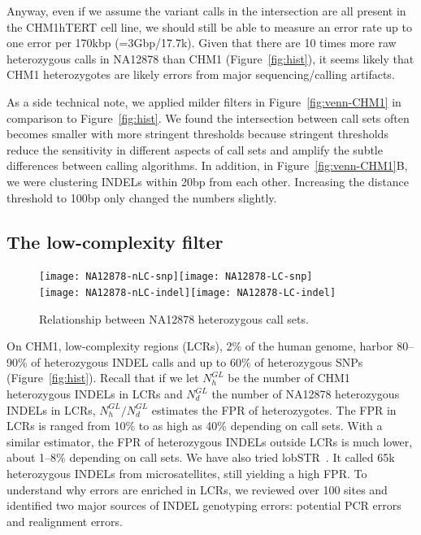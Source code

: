 \documentclass{bioinfo}
\begin{document}
Anyway, even if we assume the variant calls in the intersection are all present
in the CHM1hTERT cell line, we should still be able to measure an error rate up
to one error per 170kbp (=3Gbp/17.7k). Given that there are 10 times more raw
heterozygous calls in NA12878 than CHM1 (Figure~\ref{fig:hist}), it seems likely that CHM1
heterozygotes are likely errors from major sequencing/calling artifacts.


As a side technical note, we applied milder filters in
Figure~\ref{fig:venn-CHM1} in comparison to Figure~\ref{fig:hist}. We found the
intersection between call sets often becomes smaller with more stringent
thresholds because stringent thresholds reduce the sensitivity in different
aspects of call sets and amplify the subtle differences between calling algorithms. In
addition, in Figure~\ref{fig:venn-CHM1}B, we were clustering INDELs
within 20bp from each other. Increasing the distance threshold to 100bp only
changed the numbers slightly.

\subsection{The low-complexity filter}\label{sec:lc}

\begin{figure}[!htb]
\texttt{[image: NA12878-nLC-snp]}\texttt{[image: NA12878-LC-snp]}\\
\texttt{[image: NA12878-nLC-indel]}\texttt{[image: NA12878-LC-indel]}
\caption{Relationship between NA12878 heterozygous call sets.}\label{fig:venn-NA12878}
\end{figure}

On CHM1, low-complexity regions (LCRs), 2\% of the human genome, harbor
80--90\% of heterozygous INDEL calls and up to 60\% of heterozygous SNPs
(Figure~\ref{fig:hist}). Recall that if we let $N_h^{GL}$ be the number of CHM1
heterozygous INDELs in LCRs and $N_d^{GL}$ the number of NA12878 heterozygous
INDELs in LCRs, $N_h^{GL}/N_d^{GL}$ estimates the FPR of heterozygotes. The FPR
in LCRs is ranged from 10\% to as high as 40\% depending on call sets. With a
similar estimator, the FPR of heterozygous INDELs outside LCRs is much lower, about 1--8\% depending on call sets.
We have also tried lobSTR~\citep{Gymrek:2012aa}. It called 65k
heterozygous INDELs from microsatellites, still yielding a high FPR. To
understand why errors are enriched in LCRs, we reviewed over 100 sites and
identified two major sources of INDEL genotyping errors: potential PCR errors
and realignment errors.
\end{document}

